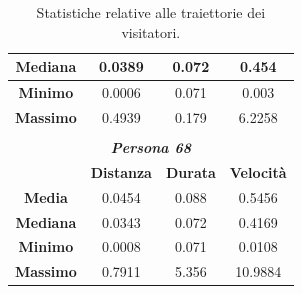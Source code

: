 \documentclass[12pt]{article}
\begin{document}
\begin{table}[!ht]
\begin{tabular}{cccc}
    \multicolumn{1}{|c|}{\textbf{Mediana}} & \multicolumn{1}{c|}{0.0389}            & \multicolumn{1}{c|}{0.072}           & \multicolumn{1}{c|}{0.454}             \\ \hline
    \multicolumn{1}{|c|}{\textbf{Minimo}}  & \multicolumn{1}{c|}{0.0006}            & \multicolumn{1}{c|}{0.071}           & \multicolumn{1}{c|}{0.003}             \\ \hline
    \multicolumn{1}{|c|}{\textbf{Massimo}} & \multicolumn{1}{c|}{0.4939}            & \multicolumn{1}{c|}{0.179}           & \multicolumn{1}{c|}{6.2258}            \\ \hline
                                           &                                        &                                      &                                        \\
    \multicolumn{4}{c}{\textit{\textbf{Persona 68}}}                                                                                                                \\ \cline{2-4} 
    \multicolumn{1}{c|}{}                  & \multicolumn{1}{c|}{\textbf{Distanza}} & \multicolumn{1}{c|}{\textbf{Durata}} & \multicolumn{1}{c|}{\textbf{Velocità}} \\ \hline
    \multicolumn{1}{|c|}{\textbf{Media}}   & \multicolumn{1}{c|}{0.0454}            & \multicolumn{1}{c|}{0.088}           & \multicolumn{1}{c|}{0.5456}            \\ \hline
    \multicolumn{1}{|c|}{\textbf{Mediana}} & \multicolumn{1}{c|}{0.0343}            & \multicolumn{1}{c|}{0.072}           & \multicolumn{1}{c|}{0.4169}            \\ \hline
    \multicolumn{1}{|c|}{\textbf{Minimo}}  & \multicolumn{1}{c|}{0.0008}            & \multicolumn{1}{c|}{0.071}           & \multicolumn{1}{c|}{0.0108}            \\ \hline
    \multicolumn{1}{|c|}{\textbf{Massimo}} & \multicolumn{1}{c|}{0.7911}            & \multicolumn{1}{c|}{5.356}           & \multicolumn{1}{c|}{10.9884}           \\ \hline
    \end{tabular}
    \caption{Statistiche relative alle traiettorie dei visitatori.}
    \label{trajectories_aggregates_informations}
\end{table}
\end{document}
